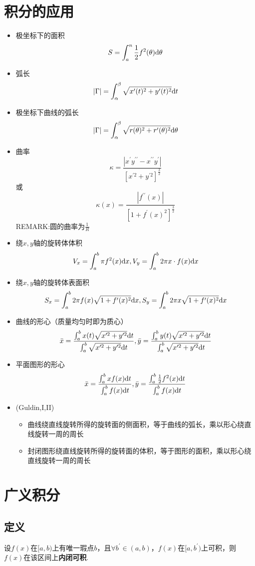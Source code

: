 \documentclass[./main.tex]{subfiles}
\begin{document}
\section{积分的应用}
\begin{itemize}
  \item 极坐标下的面积$$S=\int_a^n\frac{1}{2}f^2(\theta)\text{d}\theta$$
  \item 弧长$$|\Gamma|=\int_{\alpha}^{\beta}\sqrt{x^{\prime}(t)^2+y^{\prime}(t)^2}\text{d}t$$
  \item 极坐标下曲线的弧长$$|\Gamma|=\int_{\alpha}^{\beta}\sqrt{r(\theta)^2+r^{\prime}(\theta)^2}\text{d}\theta$$
  \item 曲率$$\kappa=\frac{|x^{\prime}y^{\prime\prime}-x^{\prime\prime}y^{\prime}|}{[x^{\prime 2}+y^{\prime 2}]^{\frac{3}{2}}} $$或$$\kappa(x)=\frac{|f^{\prime\prime}(x)|}{[1+f^{\prime}(x)^2]^{\frac{3}{2}}} $$
  REMARK:圆的曲率为$\frac{1}{R}$
  \item 绕$x,y$轴的旋转体体积$$V_x=\int_a^b\pi f^2(x)\text{d}x,V_y=\int_a^b2\pi x\cdot f(x)\text{d}x$$
  \item 绕$x,y$轴的旋转体表面积$$S_x=\int_a^b2\pi f(x)\sqrt{1+f^{\prime}(x)^2}\text{d}x,S_y=\int_a^b2\pi x\sqrt{1+f^{\prime}(x)^2}\text{d}x$$
  \item 曲线的形心（质量均匀时即为质心）$$\bar{x}=\frac{\int_a^bx(t)\sqrt{x^{\prime 2}+y^{\prime 2}}\text{d}t}{\int_a^b\sqrt{x^{\prime 2}+y^{\prime 2}}\text{d}t},\bar{y}=\frac{\int_a^by(t)\sqrt{x^{\prime 2}+y^{\prime 2}}\text{d}t}{\int_a^b\sqrt{x^{\prime 2}+y^{\prime 2}}\text{d}t}$$
  \item 平面图形的形心$$\bar{x}=\frac{\int_a^bxf(x)\text{d}t}{\int_a^bf(x)\text{d}t},\bar{y}=\frac{\int_a^b\frac{1}{2}f^2(x)\text{d}t}{\int_a^bf(x)\text{d}t}$$
  \item (Guldin,I,II)
  \begin{itemize}
    \item 曲线绕直线旋转所得的旋转面的侧面积，等于曲线的弧长，乘以形心绕直线旋转一周的周长
    \item 封闭图形绕直线旋转所得的旋转面的体积，等于图形的面积，乘以形心绕直线旋转一周的周长
  \end{itemize}
\end{itemize}
\section{广义积分}
\subsection{定义}
设$f(x)$在$[a,b)$上有唯一瑕点$b$，且$\forall b^{\prime}\in(a,b)$，$f(x)$在$[a,b^{\prime})$上可积，则$f(x)$在该区间上\textbf{内闭可积}.
\end{document}
